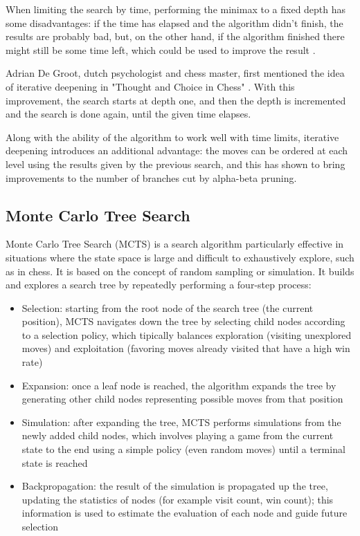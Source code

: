 When limiting the search by time, performing the minimax to a fixed depth has some disadvantages: if the time has elapsed and the algorithm didn't finish, the results are probably bad, but, on the other hand, if the algorithm finished there might still be some time left, which could be used to improve the result \cite{carolus2006alpha}.

Adrian De Groot, dutch psychologist and chess master, first mentioned the idea of iterative deepening in "Thought and Choice in Chess" \cite{thought2014groot}. With this improvement, the search starts at depth one, and then the depth is incremented and the search is done again, until the given time elapses.

Along with the ability of the algorithm to work well with time limits, iterative deepening introduces an additional advantage: the moves can be ordered at each level using the results given by the previous search, and this has shown to bring improvements to the number of branches cut by alpha-beta pruning.

\subsection{Monte Carlo Tree Search}
\label{subsec:ch2sec2subsec5}

Monte Carlo Tree Search (MCTS) is a search algorithm particularly effective in situations where the state space is large and difficult to exhaustively explore, such as in chess. It is based on the concept of random sampling or simulation. It builds and explores a search tree by repeatedly performing a four-step process:
\begin{itemize}
    \item Selection: starting from the root node of the search tree (the current position), MCTS navigates down the tree by selecting child nodes according to a selection policy, which tipically balances exploration (visiting unexplored moves) and exploitation (favoring moves already visited that have a high win rate)
    \item Expansion: once a leaf node is reached, the algorithm expands the tree by generating other child nodes representing possible moves from that position
    \item Simulation: after expanding the tree, MCTS performs simulations from the newly added child nodes, which involves playing a game from the current state to the end using a simple policy (even random moves) until a terminal state is reached
    \item Backpropagation: the result of the simulation is propagated up the tree, updating the statistics of nodes (for example visit count, win count); this information is used to estimate the evaluation of each node and guide future selection
\end{itemize}

